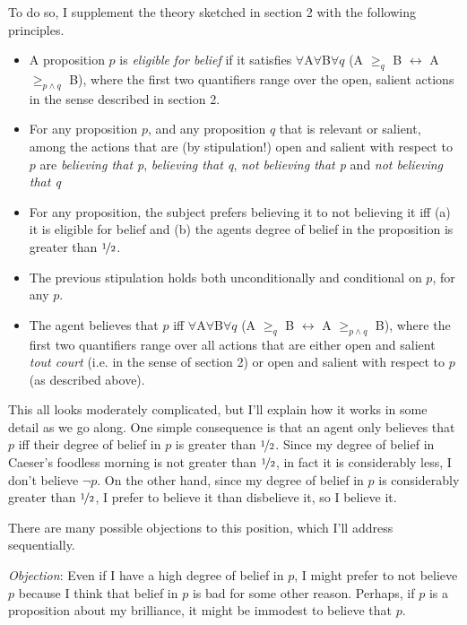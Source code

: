 To do so, I supplement the theory sketched in section 2 with the following principles.


\begin{itemize}
\item A proposition \(p\) is \textit{eligible} \textit{for belief} if it satisfies \(\forall\)A\(\forall\)B\(\forall q\) (A \(\geq _q\) B \(\leftrightarrow\) A \(\geq _{p \wedge q}\) B), where the first two quantifiers range over the open, salient actions in the sense described in section 2.
\item For any proposition \(p\), and any proposition \(q\) that is relevant or salient, among the actions that are (by stipulation!) open and salient with respect to \(p\) are \textit{believing that p}, \textit{believing that q}, \textit{not believing that p} and \textit{not believing that q}
\item For any proposition, the subject prefers believing it to not believing it iff (a) it is eligible for belief and (b) the agents degree of belief in the proposition is greater than \(\nicefrac{1}{2}\). 
\item The previous stipulation holds both unconditionally and conditional on \(p\), for any \(p\).
\item The agent believes that \(p\) iff \(\forall\)A\(\forall\)B\(\forall q\) (A \(\geq _q\) B \(\leftrightarrow\) A \(\geq _{p \wedge q}\) B), where the first two quantifiers range over all actions that are either open and salient \textit{tout court} (i.e. in the sense of section 2) or open and salient with respect to \(p\) (as described above).
\end{itemize}

\noindent This all looks moderately complicated, but I'll explain how it works in some detail as we go along. One simple consequence is that an agent only believes that \(p\) iff their degree of belief in \(p\) is greater than \(\nicefrac{1}{2}\). Since my degree of belief in Caeser's foodless morning is not greater than \(\nicefrac{1}{2}\), in fact it is considerably less, I don't believe \(\neg p\). On the other hand, since my degree of belief in \(p\) is considerably greater than \(\nicefrac{1}{2}\), I prefer to believe it than disbelieve it, so I believe it.

There are many possible objections to this position, which I'll address sequentially.

\medskip

\noindent \textit{Objection}: Even if I have a high degree of belief in \(p\), I might prefer to not believe \(p\) because I think that belief in \(p\) is bad for some other reason. Perhaps, if \(p\) is a proposition about my brilliance, it might be immodest to believe that \(p\).

